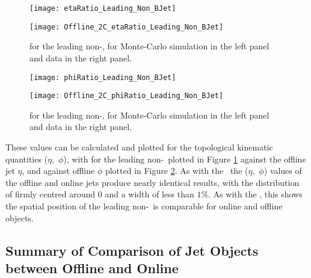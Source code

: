 	\begin{figure}[h]
		\centering
		\begin{minipage}[h]{0.47\linewidth}
			\texttt{[image: etaRatio\_Leading\_Non\_BJet]}

		\end{minipage}
		\begin{minipage}[h]{0.47\linewidth}
			\texttt{[image: Offline\_2C\_etaRatio\_Leading\_Non\_BJet]}
		\end{minipage}
		\caption[\dee for the leading non-\bjet\ in data and Monte-Carlo simulations]{\dee for the leading non-\bjet, for Monte-Carlo simulation in the left panel and data in the right panel.}
		\label{fig:O:leadingnonbeta}
	\end{figure}

	\begin{figure}[h]
		\centering
		\begin{minipage}[h]{0.47\linewidth}
			\texttt{[image: phiRatio\_Leading\_Non\_BJet]}

		\end{minipage}
		\begin{minipage}[h]{0.47\linewidth}
			\texttt{[image: Offline\_2C\_phiRatio\_Leading\_Non\_BJet]}
		\end{minipage}
		\caption[\dphph for the leading non-\bjet\ in data and Monte-Carlo simulations]{\dphph for the leading non-\bjet, for Monte-Carlo simulation in the left panel and data in the right panel.}
		\label{fig:O:leadingnonbphi}
	\end{figure}

	These \dxx values can be calculated and plotted for the topological kinematic quantities ($\eta$,~$\phi$), with \dee for the leading non-\bjet\ plotted in Figure \ref{fig:O:leadingnonbeta} against the offline jet $\eta$, and \dphph against offline $\phi$ plotted in Figure \ref{fig:O:leadingnonbphi}. As with the \bjets\, the ($\eta$,~$\phi$) values of the offline and online jets produce nearly identical results, with the distribution of \dxx firmly centred around 0 and a width of less than $1\%$. As with the \bjets, this shows the spatial position of the leading non-\bjet\ is comparable for online and offline objects.


	\subsection{Summary of Comparison of Jet Objects between Offline and Online}
	\label{obp:jetsum}

